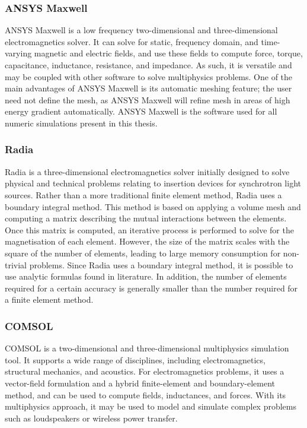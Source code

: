 \subsubsection{ANSYS Maxwell}
ANSYS Maxwell is a low frequency two-dimensional and three-dimensional electromagnetics solver. It can solve for static, frequency domain, and time-varying magnetic and electric fields, and use these fields to compute force, torque, capacitance, inductance, resistance, and impedance. As such, it is versatile and may be coupled with other software to solve multiphysics problems. One of the main advantages of ANSYS Maxwell is its automatic meshing feature; the user need not define the mesh, as ANSYS Maxwell will refine mesh in areas of high energy gradient automatically. ANSYS Maxwell is the software used for all numeric simulations present in this thesis.

\subsubsection{Radia}
Radia is a three-dimensional electromagnetics solver initially designed to solve physical and technical problems relating to insertion devices for synchrotron light sources. Rather than a more traditional finite element method, Radia uses a boundary integral method. This method is based on applying a volume mesh and computing a matrix describing the mutual interactions between the elements. Once this matrix is computed, an iterative process is performed to solve for the magnetisation of each element. However, the size of the matrix scales with the square of the number of elements, leading to large memory consumption for non-trivial problems. Since Radia uses a boundary integral method, it is possible to use analytic formulas found in literature. In addition, the number of elements required for a certain accuracy is generally smaller than the number required for a finite element method.

\subsubsection{COMSOL}
COMSOL is a two-dimensional and three-dimensional multiphysics simulation tool. It supports a wide range of disciplines, including electromagnetics, structural mechanics, and acoustics. For electromagnetics problems, it uses a vector-field formulation and a hybrid finite-element and boundary-element method, and can be used to compute fields, inductances, and forces. With its multiphysics approach, it may be used to model and simulate complex problems such as loudspeakers or wireless power transfer.

